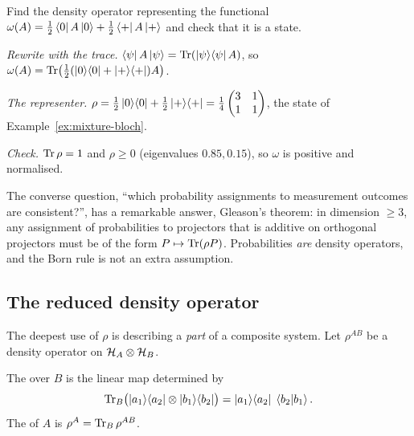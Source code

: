 \begin{example}\label{ex:riesz-state}
  Find the density operator representing the functional $\omega(A)=\tfrac12\left\langle0\right|A\left|0\right\rangle+\tfrac12\left\langle+\right|A\left|+\right\rangle$ and check that it is a state.
\end{example}
\begin{solution}
  \begin{steps}
    \item \emph{Rewrite with the trace.} $\left\langle\psi\right| A\left|\psi\right\rangle=\operatorname{Tr}(\left|\psi\right\rangle\!\left\langle\psi\right| A)$, so $\omega(A)=\operatorname{Tr}\bigl(\tfrac12(\left|0\right\rangle\!\left\langle0\right|+\left|+\right\rangle\!\left\langle+\right|)A\bigr)$.
    \item \emph{The representer.} $\rho=\tfrac12\left|0\right\rangle\!\left\langle0\right|+\tfrac12\left|+\right\rangle\!\left\langle+\right|=\tfrac14\begin{pmatrix}3&1\\1&1\end{pmatrix}$, the state of Example~\ref{ex:mixture-bloch}.
    \item \emph{Check.} $\operatorname{Tr}\rho=1$ and $\rho\ge0$ (eigenvalues $0.85,0.15$), so $\omega$ is positive and normalised.
  \end{steps}
\end{solution}

\begin{lookahead}
  The converse question, ``which probability assignments to measurement outcomes are consistent?'', has a remarkable answer, Gleason's theorem: in dimension $\ge3$, any assignment of probabilities to projectors that is additive on orthogonal projectors must be of the form $P\mapsto\operatorname{Tr}(\rho P)$. Probabilities \emph{are} density operators, and the Born rule is not an extra assumption.
\end{lookahead}

\subsection{The reduced density operator}

The deepest use of $\rho$ is describing a \emph{part} of a composite system. Let $\rho^{AB}$ be a density operator on $\mathcal{H}_A\otimes\mathcal{H}_B$.

\begin{definition}\label{def:ptrace}
  The  over $B$ is the linear map determined by
  \[
    \operatorname{Tr}_B\bigl(\left|a_1\right\rangle\!\left\langle a_2\right|\otimes\left|b_1\right\rangle\!\left\langle b_2\right|\bigr)=\left|a_1\right\rangle\!\left\langle a_2\right|\;\left\langle b_2\middle|b_1\right\rangle.
  \]
  The  of $A$ is $\rho^A=\operatorname{Tr}_B\rho^{AB}$.
\end{definition}

